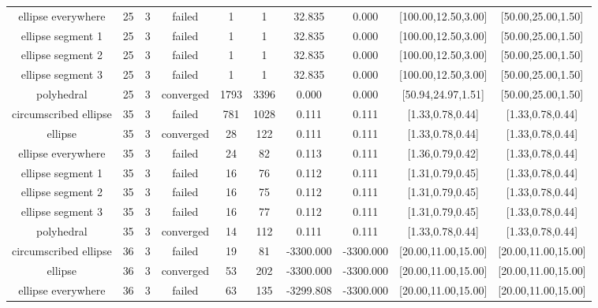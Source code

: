 \begin{tiny}
\begin{center}
\begin{longtable}{ c c c c c c c c c c }
    ellipse everywhere    &   25  &  3  &   failed   &   1   &   1   &   32.835   &   0.000    & [100.00,12.50,3.00] & [50.00,25.00,1.50] \\
    ellipse segment 1     &   25  &  3  &   failed   &   1   &   1   &   32.835   &   0.000    & [100.00,12.50,3.00] & [50.00,25.00,1.50] \\
    ellipse segment 2     &   25  &  3  &   failed   &   1   &   1   &   32.835   &   0.000    & [100.00,12.50,3.00] & [50.00,25.00,1.50] \\
    ellipse segment 3     &   25  &  3  &   failed   &   1   &   1   &   32.835   &   0.000    & [100.00,12.50,3.00] & [50.00,25.00,1.50] \\
        polyhedral        &   25  &  3  & converged  &  1793 &  3396 &   0.000    &   0.000    & [50.94,24.97,1.51] & [50.00,25.00,1.50] \\
  circumscribed ellipse   &   35  &  3  &   failed   &  781  &  1028 &   0.111    &   0.111    & [1.33,0.78,0.44] & [1.33,0.78,0.44] \\
         ellipse          &   35  &  3  & converged  &   28  &  122  &   0.111    &   0.111    & [1.33,0.78,0.44] & [1.33,0.78,0.44] \\
    ellipse everywhere    &   35  &  3  &   failed   &   24  &   82  &   0.113    &   0.111    & [1.36,0.79,0.42] & [1.33,0.78,0.44] \\
    ellipse segment 1     &   35  &  3  &   failed   &   16  &   76  &   0.112    &   0.111    & [1.31,0.79,0.45] & [1.33,0.78,0.44] \\
    ellipse segment 2     &   35  &  3  &   failed   &   16  &   75  &   0.112    &   0.111    & [1.31,0.79,0.45] & [1.33,0.78,0.44] \\
    ellipse segment 3     &   35  &  3  &   failed   &   16  &   77  &   0.112    &   0.111    & [1.31,0.79,0.45] & [1.33,0.78,0.44] \\
        polyhedral        &   35  &  3  & converged  &   14  &  112  &   0.111    &   0.111    & [1.33,0.78,0.44] & [1.33,0.78,0.44] \\
  circumscribed ellipse   &   36  &  3  &   failed   &   19  &   81  & -3300.000  & -3300.000  & [20.00,11.00,15.00] & [20.00,11.00,15.00] \\
         ellipse          &   36  &  3  & converged  &   53  &  202  & -3300.000  & -3300.000  & [20.00,11.00,15.00] & [20.00,11.00,15.00] \\
    ellipse everywhere    &   36  &  3  &   failed   &   63  &  135  & -3299.808  & -3300.000  & [20.00,11.00,15.00] & [20.00,11.00,15.00] \\

\end{longtable}
\end{center}
\end{tiny}
